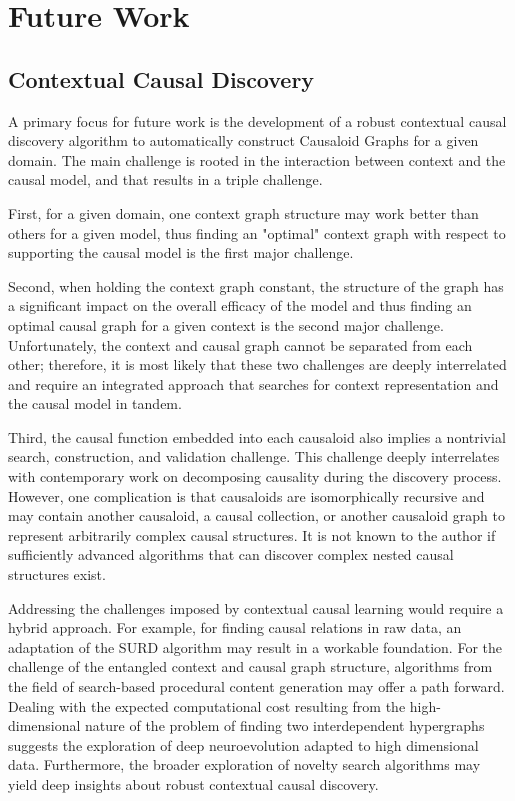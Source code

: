 \section{Future Work}
\label{sec:future_work}

 
\subsection{Contextual Causal Discovery}


A primary focus for future work is the development of a robust contextual causal discovery algorithm to automatically construct Causaloid Graphs for a given domain. The main challenge is rooted in the interaction between context and the causal model, and that results in a triple challenge.

First, for a given domain, one context graph structure may work better than others for a given model, thus finding an "optimal" context graph with respect to supporting the causal model is the first major challenge. 

 Second, when holding the context graph constant, the structure of the graph has a significant impact on the overall efficacy of the model and thus finding an optimal causal graph for a given context is the second major challenge. Unfortunately,  the context and causal graph cannot be separated from each other; therefore, it is most likely that these two challenges are deeply interrelated and require an integrated approach that searches for context representation and the causal model in tandem.  
 
Third, the causal function embedded into each causaloid also implies a nontrivial search, construction, and validation challenge. This challenge deeply interrelates with contemporary work on decomposing causality during the discovery process. However, one complication is that causaloids are isomorphically recursive and may contain another causaloid, a causal collection, or another causaloid graph to represent arbitrarily complex causal structures. It is not known to the author if sufficiently advanced algorithms that can discover complex nested causal structures exist. 


Addressing the challenges imposed by contextual causal learning would require a hybrid approach. For example, for finding causal relations in raw data, an adaptation of the SURD algorithm\cite{martinez2024decomposing} may result in a workable foundation. For the challenge of the entangled context and causal graph structure, algorithms from the field of search-based procedural content generation\cite{togelius2011search} may offer a path forward. Dealing with the expected computational cost resulting from the high-dimensional nature of the problem of finding two interdependent hypergraphs suggests the exploration of deep neuro\-evolution adapted to high dimensional data\cite{colas2020scaling}. Furthermore, the broader exploration of novelty search\cite{lehman2011abandoning} algorithms may yield deep insights about robust contextual causal discovery. 



